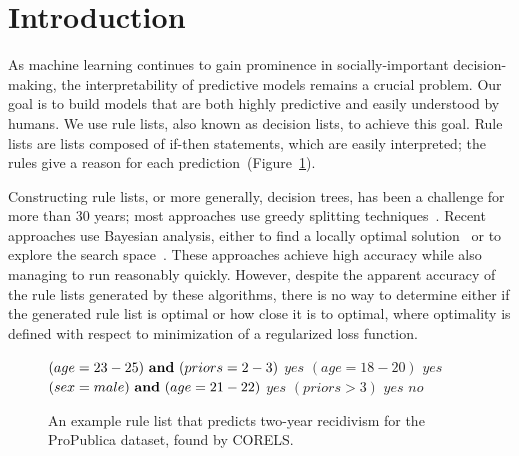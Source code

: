 \section{Introduction}

As machine learning continues to gain prominence in socially-important decision-making,
the interpretability of predictive models remains a crucial problem.
%
Our goal is to build models that are both highly predictive and easily understood by humans.
%
We use rule lists, also known as decision lists, to achieve this goal.
%
Rule lists are lists composed of if-then statements, which are easily interpreted; the rules give a reason for each prediction~(Figure~\ref{fig:rule-list}).

Constructing rule lists, or more generally, decision trees, has been a challenge for more than
30 years; most approaches use greedy splitting techniques~\citep{Rivest87,Breiman84,Quinlan93}. 
%
Recent approaches use Bayesian analysis, either to find a locally optimal solution~\citep{Chipman:1998jh} or to explore the search space~\citep{LethamRuMcMa15, YangRuSe16}.
%
These approaches achieve high accuracy while also managing to run reasonably quickly.
%
However, despite the apparent accuracy of the rule lists generated by these algorithms,
there is no way to determine either if the generated rule list is optimal or how close it is to optimal,
where optimality is defined with respect to minimization of a regularized loss function.

\begin{arxiv}
\begin{figure}[t!]
\begin{algorithmic}
\State \bif $(age=23-25) {\bf ~and~} (priors=2-3)$ \bthen $yes$
\State \belif $(age=18-20)$ \bthen $yes$
\State \belif $(sex=male) {\bf ~and~} (age=21-22)$ \bthen $yes$
\State \belif $(priors>3)$ \bthen $yes$
\State \belse $no$
\end{algorithmic}
\caption{An example rule list that predicts two-year recidivism
for the ProPublica dataset, found by CORELS.
}
\label{fig:rule-list}
\end{figure}
\end{arxiv}

